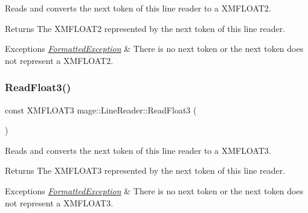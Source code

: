 Reads and converts the next token of this line reader to a {\ttfamily X\+M\+F\+L\+O\+A\+T2}.

\begin{DoxyReturn}{Returns}
The {\ttfamily X\+M\+F\+L\+O\+A\+T2} represented by the next token of this line reader. 
\end{DoxyReturn}

\begin{DoxyExceptions}{Exceptions}
{\em \hyperlink{structmage_1_1_formatted_exception}{Formatted\+Exception}} & There is no next token or the next token does not represent a {\ttfamily X\+M\+F\+L\+O\+A\+T2}. \\
\hline
\end{DoxyExceptions}
\hypertarget{classmage_1_1_line_reader_a7a605a7c2402051f1ca4fda1e543fc28}{}\label{classmage_1_1_line_reader_a7a605a7c2402051f1ca4fda1e543fc28} 
\subsubsection{\texorpdfstring{Read\+Float3()}{ReadFloat3()}}
{\footnotesize\ttfamily const X\+M\+F\+L\+O\+A\+T3 mage\+::\+Line\+Reader\+::\+Read\+Float3 (\begin{DoxyParamCaption}{ }\end{DoxyParamCaption})\hspace{0.3cm}{\ttfamily [protected]}}

Reads and converts the next token of this line reader to a {\ttfamily X\+M\+F\+L\+O\+A\+T3}.

\begin{DoxyReturn}{Returns}
The {\ttfamily X\+M\+F\+L\+O\+A\+T3} represented by the next token of this line reader. 
\end{DoxyReturn}

\begin{DoxyExceptions}{Exceptions}
{\em \hyperlink{structmage_1_1_formatted_exception}{Formatted\+Exception}} & There is no next token or the next token does not represent a {\ttfamily X\+M\+F\+L\+O\+A\+T3}. \\
\hline
\end{DoxyExceptions}
\hypertarget{classmage_1_1_line_reader_aaa21896aa756c3402cfeb207ef5f2029}{}\label{classmage_1_1_line_reader_aaa21896aa756c3402cfeb207ef5f2029} 
